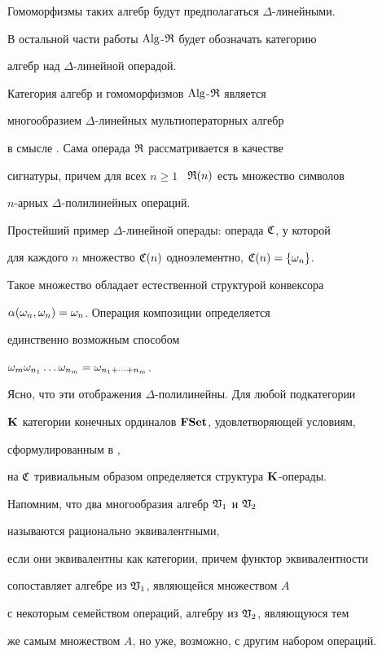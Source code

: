 Гомоморфизмы таких алгебр будут предполагаться $\Delta$-линейными.


В остальной части работы $\Alg$-$\R$ будет обозначать категорию


алгебр над $\Delta$-линейной операдой.


Категория алгебр и гомоморфизмов $\Alg$-$\R$ является 


многообразием $\Delta$-линейных мультиоператорных алгебр


в смысле \cite{T0}. Сама операда $\R$ рассматривается в качестве


сигнатуры, причем для всех $n\ge 1$ \ $\R(n)$ есть множество символов


$n$-арных $\Delta$-полилинейных операций.





Простейший пример $\Delta$-линейной операды: операда $\C$, у которой


для каждого $n$ множество $\C(n)$ одноэлементно, $\C(n)=\{ \o_n \} $.


Такое множество обладает естественной структурой конвексора


$\al(\o_n,\o_n)=\o_n$. Операция композиции определяется


единственно возможным способом


$\o_m\o_{n_1}\dotsc\o_{n_m}=\o_{n_1+\dotsb+n_m}$.


Ясно, что эти отображения $\Delta$-полилинейны. Для любой подкатегории


$\P$ категории конечных ординалов $\bold{FSet}$, удовлетворяющей условиям,


сформулированным в \cite{T0},


на $\C$ тривиальным образом определяется структура $\P$-операды.








Напомним, что два многообразия алгебр $\frak V_1$ и $\frak V_2$


называются рационально эквивалентными,


если они эквивалентны как категории, причем функтор эквивалентности


сопоставляет алгебре из ${\frak V}_1$, являющейся множеством $A$


с некоторым семейством операций, алгебру из ${\frak V}_2$, являющуюся тем


же самым множеством $A$, но уже, возможно, с другим набором операций.


